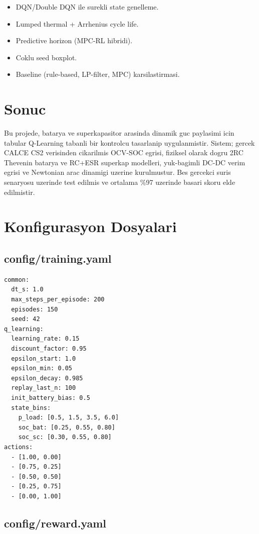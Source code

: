 \documentclass[11pt,a4paper]{article}
\begin{document}
\begin{itemize}
  \item DQN/Double DQN ile surekli state genelleme.
  \item Lumped thermal + Arrhenius cycle life.
  \item Predictive horizon (MPC-RL hibridi).
  \item Coklu seed boxplot.
  \item Baseline (rule-based, LP-filter, MPC) karsilastirmasi.
\end{itemize}

\section{Sonuc}

Bu projede, batarya ve superkapasitor arasinda dinamik guc paylasimi icin tabular Q-Learning tabanli bir kontrolcu tasarlanip uygulanmistir. Sistem; gercek CALCE CS2 verisinden cikarilmis OCV-SOC egrisi, fiziksel olarak dogru 2RC Thevenin batarya ve RC+ESR superkap modelleri, yuk-bagimli DC-DC verim egrisi ve Newtonian arac dinamigi uzerine kurulmustur. Bes gercekci suris senaryosu uzerinde test edilmis ve ortalama \%97 uzerinde basari skoru elde edilmistir.

\appendix

\section{Konfigurasyon Dosyalari}

\subsection{config/training.yaml}

\begin{lstlisting}[style=yaml]
common:
  dt_s: 1.0
  max_steps_per_episode: 200
  episodes: 150
  seed: 42
q_learning:
  learning_rate: 0.15
  discount_factor: 0.95
  epsilon_start: 1.0
  epsilon_min: 0.05
  epsilon_decay: 0.985
  replay_last_n: 100
  init_battery_bias: 0.5
  state_bins:
    p_load: [0.5, 1.5, 3.5, 6.0]
    soc_bat: [0.25, 0.55, 0.80]
    soc_sc: [0.30, 0.55, 0.80]
actions:
  - [1.00, 0.00]
  - [0.75, 0.25]
  - [0.50, 0.50]
  - [0.25, 0.75]
  - [0.00, 1.00]
\end{lstlisting}

\subsection{config/reward.yaml}
\end{document}
